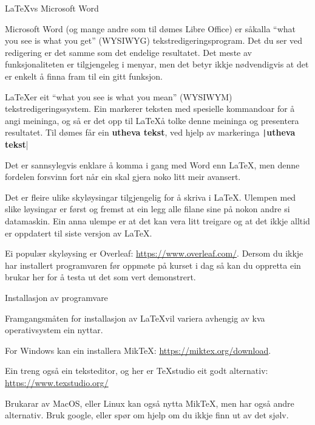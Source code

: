 \documentclass[10pt,a4paper]{beamer}
\begin{document}
	\begin{frame}{\LaTeX vs Microsoft Word}
		
		Microsoft Word (og mange andre som til dømes Libre Office) er såkalla ``what you see is what you get'' (WYSIWYG) tekstredigeringsprogram. Det du ser ved redigering er det samme som det endelige resultatet. Det meste av funksjonaliteten er tilgjengeleg i menyar, men det betyr ikkje nødvendigvis at det er enkelt å finna fram til ein gitt funksjon.
		
		\LaTeX er eit ``what you see is what you mean'' (WYSIWYM) tekstredigeringssystem. Ein markerer teksten med spesielle kommandoar for å angi meininga, og så er det opp til \LaTeX å tolke denne meininga og presentera resultatet. Til dømes får ein \textbf{utheva tekst}, ved hjelp av markeringa \texttt|\textbf{utheva tekst}|
		
		Det er sannsylegvis enklare å komma i gang med Word enn \LaTeX, men denne fordelen forsvinn fort når ein skal gjera noko litt meir avansert.
	\end{frame}
	
	\begin{frame}
		
		Det er fleire ulike skyløysingar tilgjengelig for å skriva i \LaTeX. Ulempen med slike løysingar er først og fremst at ein legg alle filane sine på nokon andre si datamaskin. Ein anna ulempe er at det kan vera litt treigare og at det ikkje alltid er oppdatert til siste versjon av \LaTeX.
		
		Ei populær skyløysing er Overleaf: \url{https://www.overleaf.com/}. Dersom du ikkje har installert programvaren før oppmøte på kurset i dag så kan du oppretta ein brukar her for å testa ut det som vert demonstrert.
		
	\end{frame}
	
	
	\begin{frame}{Installasjon av programvare}
		
		Framgangsmåten for installasjon av \LaTeX vil variera avhengig av kva operativsystem ein nyttar.
		
		For Windows kan ein installera MikTeX: \url{https://miktex.org/download}.
		
		Ein treng også ein teksteditor, og her er TeXstudio eit godt alternativ: \url{https://www.texstudio.org/}
		
		Brukarar av MacOS, eller Linux kan også nytta MikTeX, men har også andre alternativ. Bruk google, eller spør om hjelp om du ikkje finn ut av det sjølv.
	\end{frame}
	
\end{document}
